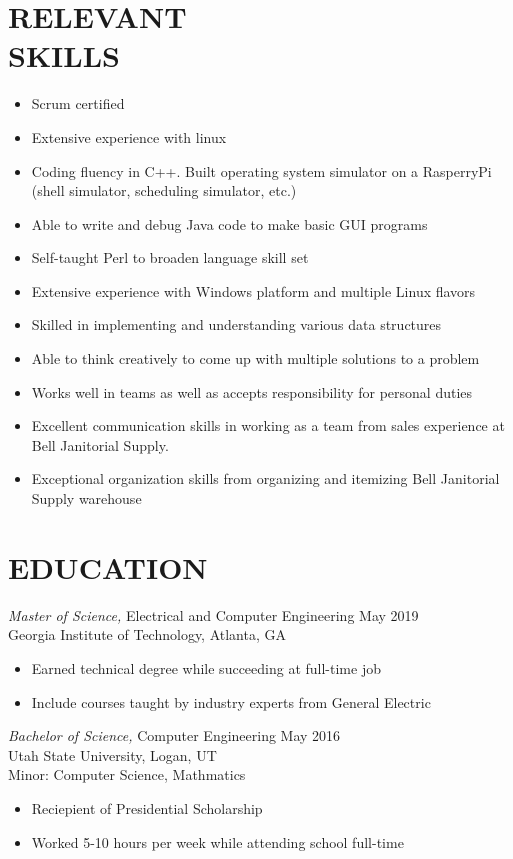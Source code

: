 \documentclass[line,margin]{res}
\begin{document}
\begin{resume}
	\section{RELEVANT\\SKILLS}
	\begin{itemize}
		\item Scrum certified
		\item Extensive experience with linux
		\item Coding fluency in C++. Built operating system simulator on
		      a RasperryPi (shell simulator, scheduling simulator, etc.)
		\item Able to write and debug Java code to make basic GUI programs
		\item Self-taught Perl to broaden language skill set
		\item Extensive experience with Windows platform and multiple Linux flavors
		\item Skilled in implementing and understanding various data structures
		\item Able to think creatively to come up with multiple solutions to a problem
		\item Works well in teams as well as accepts responsibility for personal duties
		\item Excellent communication skills in working as a team from sales experience
		      at Bell Janitorial Supply.
		\item Exceptional organization skills from organizing and itemizing Bell 								Janitorial Supply warehouse
	\end{itemize}

	\section{EDUCATION}
	{\sl Master of Science,} Electrical and Computer Engineering \hfill May 2019\\
   Georgia Institute of Technology, Atlanta, GA
   \begin{itemize} \itemsep -2pt %
	   \item Earned technical degree while succeeding at full-time job
	   \item Include courses taught by industry experts from General Electric
   \end{itemize}


   {\sl Bachelor of Science,} Computer Engineering \hfill May 2016\\
   Utah State University, Logan, UT\\
   Minor: Computer Science, Mathmatics
   \begin{itemize} \itemsep -2pt %
	   \item Reciepient of Presidential Scholarship
	   \item Worked 5-10 hours per week while attending school full-time
   \end{itemize}


\end{resume}
\end{document}
